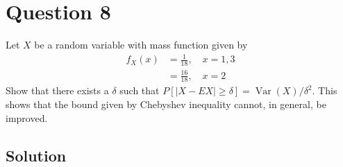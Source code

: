 \section*{Question 8}

Let \( X \) be a random variable with mass function given by
\begin{align*}
    f_{X}(x) & =\frac{1}{18}, \quad x=1,3 \\
             & =\frac{16}{18}, \quad x=2
\end{align*}
Show that there exists a \( \delta \) such that \( P[|X-E X| \geq \delta]=\operatorname{Var}(X) / \delta^{2} \).
This shows that the bound given by Chebyshev inequality cannot, in general, be improved.

\subsection*{Solution}
